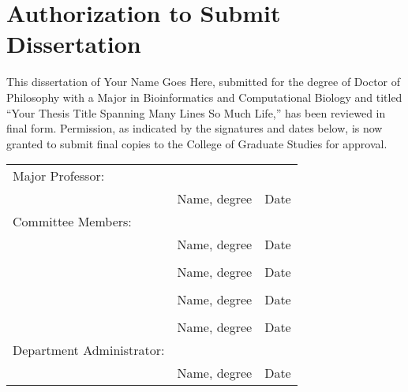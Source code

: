 \chapter*{Authorization to Submit Dissertation}

This dissertation of Your Name Goes Here, submitted for the degree of Doctor of Philosophy with a Major in Bioinformatics and Computational Biology and titled ``Your Thesis Title Spanning Many Lines So Much Life,'' has been reviewed in final form. Permission, as indicated by the signatures and dates below, is now granted to submit final copies to the College of Graduate Studies for approval.

\vspace{1in}

\begin{center}
\begin{tabular}{ p{}  p{}  p{} }
Major Professor: & \hrulefill & \hrulefill\\[-8pt]
 & Name, degree & Date\\[18pt]
Committee Members: & \hrulefill & \hrulefill\\[-8pt]
 & Name, degree & Date\\[18pt]
 & \hrulefill & \hrulefill\\[-8pt]
 & Name, degree & Date\\[18pt]
& \hrulefill & \hrulefill\\[-8pt]
 & Name, degree & Date\\[18pt]
& \hrulefill & \hrulefill\\[-8pt]
 & Name, degree & Date\\[18pt]
Department Administrator: & \hrulefill & \hrulefill\\[-8pt]
 & Name, degree & Date\\[18pt]
\end{tabular}
\end{center}
